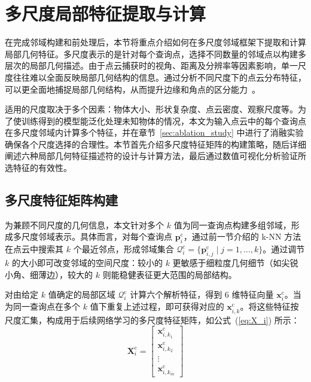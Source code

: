\section{多尺度局部特征提取与计算}
\label{sec:feature_computed}

在完成邻域构建和前处理后，本节将重点介绍如何在多尺度邻域框架下提取和计算局部几何特征。多尺度表示的是针对每个查询点，选择不同数量的邻域点以构建多层次的局部几何描述。由于点云捕获时的视角、距离及分辨率等因素影响，单一尺度往往难以全面反映局部几何结构的信息。通过分析不同尺度下的点云分布特征，可以更全面地捕捉局部几何结构，从而提升边缘和角点的区分能力~\cite{himeur_pcednet_2022}。

适用的尺度取决于多个因素：物体大小、形状复杂度、点云密度、观察尺度等。为了使训练得到的模型能泛化处理未知物体的情况，本文为输入点云中的每个查询点在多尺度邻域内计算多个特征，并在章节~\ref{sec:ablation_study} 中进行了消融实验确保各个尺度选择的合理性。本节首先介绍多尺度特征矩阵的构建策略，随后详细阐述六种局部几何特征描述符的设计与计算方法，最后通过数值可视化分析验证所选特征的有效性。

\subsection{多尺度特征矩阵构建}

为兼顾不同尺度的几何信息，本文针对多个 $k$ 值为同一查询点构建多组邻域，形成多尺度邻域表示。具体而言，对每个查询点 $\mathbf{p}_i^\text{c}$，通过前一节介绍的 k-NN 方法在点云中搜索其 $k$ 个最近邻点，形成邻域集合 $\mathcal{Q}_i^\text{c} = \{\mathbf{p}_{i,j}^\text{c} \mid j = 1, \dots, k\}$。通过调节 $k$ 的大小即可改变邻域的空间尺度：较小的 $k$ 更敏感于细粒度几何细节（如尖锐小角、细薄边），较大的 $k$ 则能稳健表征更大范围的局部结构。

对由给定 $k$ 值确定的局部区域 $\mathcal{Q}_i^\text{c}$ 计算六个解析特征，得到 6 维特征向量 $\mathbf{x}_i^\text{c}$。当为同一查询点在多个 $k$ 值下重复上述过程，即可获得对应的 $\mathbf{x}_{i,k}^\text{c}$。将这些特征按尺度汇集，构成用于后续网络学习的多尺度特征矩阵，如公式~(\ref{eq:X_i}) 所示：
\begin{equation}
    \mathbf{X}_{i}^\text{c}=\begin{bmatrix}
    \mathbf{x}_{i, k_{1}}^\text{c} \\
    \mathbf{x}_{i, k_{2}}^\text{c} \\
    \vdots \\
    \mathbf{x}_{i, k_{m}}^\text{c}
    \end{bmatrix}
    \label{eq:X_i}
\end{equation}

